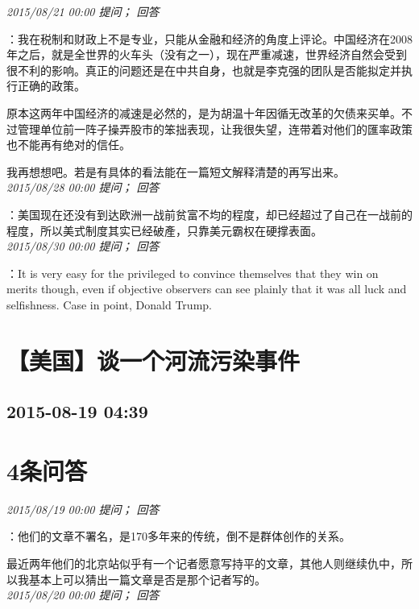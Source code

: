 \documentclass[twocolumn]{ctexart}
\begin{document}
\textit{\hfill\noindent\small 2015/08/21 00:00 提问； 回答}

：我在税制和财政上不是专业，只能从金融和经济的角度上评论。中国经济在2008年之后，就是全世界的火车头（没有之一），现在严重减速，世界经济自然会受到很不利的影响。真正的问题还是在中共自身，也就是李克强的团队是否能拟定并执行正确的政策。

原本这两年中国经济的减速是必然的，是为胡温十年因循无改革的欠债来买单。不过管理单位前一阵子操弄股市的笨拙表现，让我很失望，连带着对他们的匯率政策也不能再有绝对的信任。

我再想想吧。若是有具体的看法能在一篇短文解释清楚的再写出来。\\

\textit{\hfill\noindent\small 2015/08/28 00:00 提问； 回答}

：美国现在还没有到达欧洲一战前贫富不均的程度，却已经超过了自己在一战前的程度，所以美式制度其实已经破產，只靠美元霸权在硬撑表面。\\

\textit{\hfill\noindent\small 2015/08/30 00:00 提问； 回答}

：It is very easy for the privileged to convince themselves that they win on merits though, even if objective observers can see plainly that it was all luck and selfishness. Case in point, Donald Trump.\\


\section{【美国】谈一个河流污染事件}
\subsection{2015-08-19 04:39}


\section{4条问答}

\textit{\hfill\noindent\small 2015/08/19 00:00 提问； 回答}

：他们的文章不署名，是170多年来的传统，倒不是群体创作的关系。

最近两年他们的北京站似乎有一个记者愿意写持平的文章，其他人则继续仇中，所以我基本上可以猜出一篇文章是否是那个记者写的。\\

\textit{\hfill\noindent\small 2015/08/20 00:00 提问； 回答}
\end{document}
